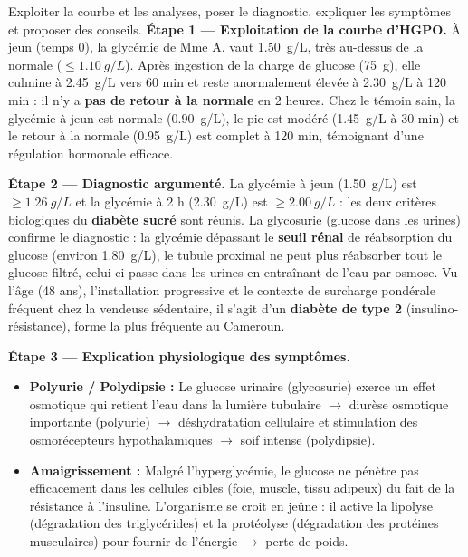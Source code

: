 \documentclass[11pt]{article}
\begin{document}
\begin{exoresolu}
Exploiter la courbe et les analyses, poser le diagnostic, expliquer les symptômes et proposer des conseils.
\tcblower
\textbf{Étape 1 — Exploitation de la courbe d'HGPO.} À jeun (temps 0), la glycémie de Mme A. vaut \SI{1,50}{g/L}, très au-dessus de la normale ($\leq \SI{1,10}{g/L}$). Après ingestion de la charge de glucose (\SI{75}{g}), elle culmine à \SI{2,45}{g/L} vers 60 min et reste anormalement élevée à \SI{2,30}{g/L} à 120 min : il n'y a \textbf{pas de retour à la normale} en 2 heures. Chez le témoin sain, la glycémie à jeun est normale (\SI{0,90}{g/L}), le pic est modéré (\SI{1,45}{g/L} à 30 min) et le retour à la normale (\SI{0,95}{g/L}) est complet à 120 min, témoignant d'une régulation hormonale efficace.

\textbf{Étape 2 — Diagnostic argumenté.} La glycémie à jeun (\SI{1,50}{g/L}) est $\geq \SI{1,26}{g/L}$ et la glycémie à 2 h (\SI{2,30}{g/L}) est $\geq \SI{2,00}{g/L}$ : les deux critères biologiques du \textbf{diabète sucré} sont réunis. La glycosurie (glucose dans les urines) confirme le diagnostic : la glycémie dépassant le \textbf{seuil rénal} de réabsorption du glucose (environ \SI{1,80}{g/L}), le tubule proximal ne peut plus réabsorber tout le glucose filtré, celui-ci passe dans les urines en entraînant de l'eau par osmose. Vu l'âge (48 ans), l'installation progressive et le contexte de surcharge pondérale fréquent chez la vendeuse sédentaire, il s'agit d'un \textbf{diabète de type 2} (insulino-résistance), forme la plus fréquente au Cameroun.

\textbf{Étape 3 — Explication physiologique des symptômes.}
\begin{itemize}
\item \textbf{Polyurie / Polydipsie :} Le glucose urinaire (glycosurie) exerce un effet osmotique qui retient l'eau dans la lumière tubulaire $\rightarrow$ diurèse osmotique importante (polyurie) $\rightarrow$ déshydratation cellulaire et stimulation des osmorécepteurs hypothalamiques $\rightarrow$ soif intense (polydipsie).
\item \textbf{Amaigrissement :} Malgré l'hyperglycémie, le glucose ne pénètre pas efficacement dans les cellules cibles (foie, muscle, tissu adipeux) du fait de la résistance à l'insuline. L'organisme se croit en jeûne : il active la lipolyse (dégradation des triglycérides) et la protéolyse (dégradation des protéines musculaires) pour fournir de l'énergie $\rightarrow$ perte de poids.
\end{itemize}


\end{exoresolu}
\end{document}
